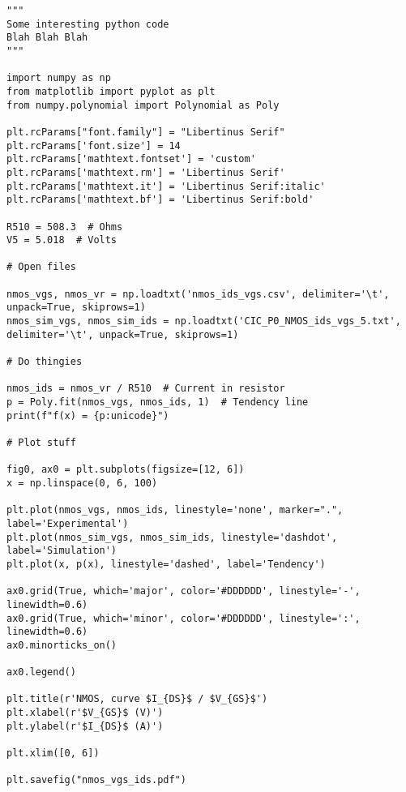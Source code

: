 \begin{code}
\label{code:apx:a:python}
\begin{verbatim}
"""
Some interesting python code 
Blah Blah Blah
"""

import numpy as np
from matplotlib import pyplot as plt
from numpy.polynomial import Polynomial as Poly

plt.rcParams["font.family"] = "Libertinus Serif"
plt.rcParams['font.size'] = 14
plt.rcParams['mathtext.fontset'] = 'custom'
plt.rcParams['mathtext.rm'] = 'Libertinus Serif'
plt.rcParams['mathtext.it'] = 'Libertinus Serif:italic'
plt.rcParams['mathtext.bf'] = 'Libertinus Serif:bold'

R510 = 508.3  # Ohms
V5 = 5.018  # Volts

# Open files

nmos_vgs, nmos_vr = np.loadtxt('nmos_ids_vgs.csv', delimiter='\t', unpack=True, skiprows=1)
nmos_sim_vgs, nmos_sim_ids = np.loadtxt('CIC_P0_NMOS_ids_vgs_5.txt', delimiter='\t', unpack=True, skiprows=1)

# Do thingies

nmos_ids = nmos_vr / R510  # Current in resistor
p = Poly.fit(nmos_vgs, nmos_ids, 1)  # Tendency line
print(f"f(x) = {p:unicode}")

# Plot stuff

fig0, ax0 = plt.subplots(figsize=[12, 6])
x = np.linspace(0, 6, 100)

plt.plot(nmos_vgs, nmos_ids, linestyle='none', marker=".", label='Experimental')
plt.plot(nmos_sim_vgs, nmos_sim_ids, linestyle='dashdot', label='Simulation')
plt.plot(x, p(x), linestyle='dashed', label='Tendency')

ax0.grid(True, which='major', color='#DDDDDD', linestyle='-', linewidth=0.6)
ax0.grid(True, which='minor', color='#DDDDDD', linestyle=':', linewidth=0.6)
ax0.minorticks_on()

ax0.legend()

plt.title(r'NMOS, curve $I_{DS}$ / $V_{GS}$')
plt.xlabel(r'$V_{GS}$ (V)')
plt.ylabel(r'$I_{DS}$ (A)')

plt.xlim([0, 6])

plt.savefig("nmos_vgs_ids.pdf")
\end{verbatim}
\end{code}

